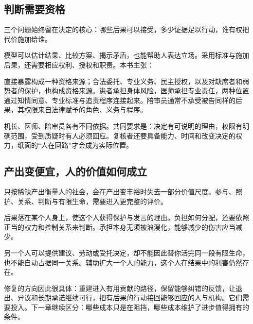 \subsection{判断需要资格}

三个问题始终留在决定的核心：哪些后果可以接受，多少证据足以行动，谁有权把代价施加给谁。

模型可以估计结果、比较方案、揭示矛盾，也能帮助人表达立场。采用标准与施加后果，还需要相应权利、授权和职责。本书主张：

直接暴露构成一种资格来源；合法委托、专业义务、民主授权，以及对缺席者和弱势者的保护，也构成资格来源。患者承担身体风险，医师承担专业责任，两种位置通过知情同意、专业标准与追责程序连接起来。陪审员通常不承受被告同样的后果，其权限来自法律赋予的角色、义务与程序。\cite{kalven1966american}

机长、医师、陪审员各有不同依据。共同要求是：决定有可说明的理由，权限有明确范围，受到质疑时有人必须回应。复核者还要具备能力、时间和改变决定的权力，纸面的“人在回路”才会成为实际位置。

\subsection{产出变便宜，人的价值如何成立}

只按稀缺产出衡量人的社会，会在产出变丰裕时失去一部分价值尺度。参与、照护、关系、判断与有限生命，需要进入更完整的评价。

后果落在某个人身上，使这个人获得保护与发言的理由。负担如何分配，还要依照正当的权力和控制关系来判断。承担本身无须被浪漫化，能够减少的伤害应当减少。

另一个人可以提供建议、劳动或受托决定，却不能因此替你活完同一段有限生命，也不能自动占据同一关系。辅助扩大一个人的能力，这个人在结果中的利害仍然存在。

修复的方向因此很具体：重建进入有用贡献的路径，保留能够纠错的反馈，让退出、异议和长期承诺继续可行，把有后果的行动接回能够回应的人与机构。它们需要投入。下一章继续区分：哪些成本只是在阻挡，哪些成本维护了进步值得拥有的条件。





\printbibliography[heading=subbibliography,title=参考文献]
